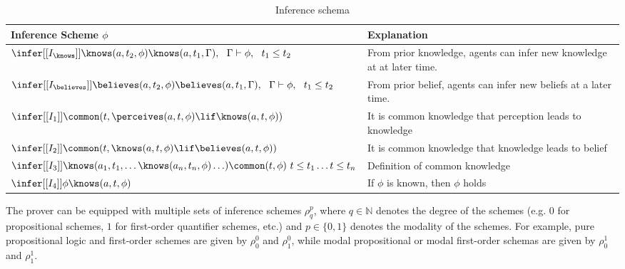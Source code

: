 { %
\renewcommand{\arraystretch}{2}

\begin{table}
\begin{footnotesize}
\begin{center}
  \begin{tabular}{lp{8cm}}
\toprule
\textbf{Inference Scheme} $\phi$& \textbf{Explanation}  \\
\midrule
$\infer[{[I_{\knows}]}]{\knows(a,t_2,\phi)}{\knows(a,t_1,\Gamma), \
    \ \Gamma\vdash\phi, \ \ t_1 \leq t_2}$ & From prior knowledge, agents
                                             can infer new knowledge
                                             at at later time.\\
$\infer[{[I_{\believes}]}]{\believes(a,t_2,\phi)}{\believes(a,t_1,\Gamma), \
    \ \Gamma\vdash\phi, \ \ t_1 \leq t_2} $ & From prior belief, agents
                                              can infer new beliefs at
                                              a later time.\\
$\infer[{[I_1]}]{\common(t,\perceives(a,t,\phi)
   \lif\knows(a,t,\phi))}{}$ & It is common knowledge that perception
                               leads to knowledge\\
$\infer[{[I_2]}]{\common(t,\knows(a,t,\phi)
    \lif\believes(a,t,\phi))}{}$ & It is common knowledge that
                                   knowledge leads to belief \\
$\infer[{[I_3]}]{\knows(a_1, t_1, \ldots
    \knows(a_n,t_n,\phi)\ldots)}{\common(t,\phi) \ t\leq t_1 \ldots t\leq
    t_n}$ & Definition of common knowledge \\
$\infer[{[I_4]}]{\phi}{\knows(a,t,\phi)}$ & If $\phi$ is known, then
                                            $\phi$ holds\\
\bottomrule
\end{tabular}
\caption{Inference schema}
\label{rules}
\end{center}
\end{footnotesize}
\end{table}
}

The prover can be equipped
with multiple sets of inference schemes $\rho^p_{q}$, where
$q\in\mathbb{N}$ denotes the degree of the schemes (e.g. $0$ for
propositional schemes, $1$ for first-order quantifier schemes, etc.)
and $p\in\{0,1\}$ denotes the modality of the schemes. For example, pure
propositional logic and first-order schemes are given by $\rho^0_{0}$
and $\rho^0_{1}$, while modal
propositional or modal first-order schemas are given by $\rho^1_{0}$ and
$\rho^1_{1}$.


